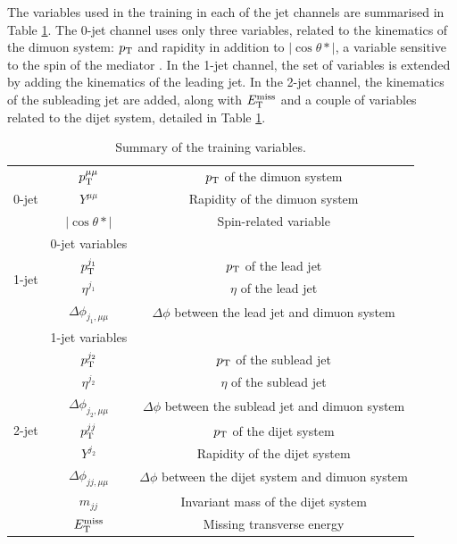 The variables used in the training in each of the jet channels are
summarised in Table \ref{tab:hmumu:variables}. The 0-jet channel uses
only three variables, related to the kinematics of the dimuon system:
$p_{\text{T}}$ and rapidity in addition to $|\cos{\theta*}|$, a variable
sensitive to the spin of the mediator \cite{PhysRevD.16.2219,
Sirunyan:2018swq}. In the 1-jet channel, the set of variables is 
extended by adding the kinematics of the leading jet. In the 2-jet
channel, the kinematics of the subleading jet are added, along with
$E_\text{T}^\text{miss}$ and a couple of variables related to the dijet system,
detailed in Table \ref{tab:hmumu:variables}.
\begin{table}[h]
\centering
\caption{Summary of the training variables.}
\label{tab:hmumu:variables}
\begin{tabular}{c c c}
\toprule
\midrule
\multirow{3}{*}{0-jet} & $p_{\text{T}}^{\mu\mu}$      & $p_{\text{T}}$ of the dimuon system \\
                       & $Y^{\mu\mu}$        & Rapidity of the dimuon system\\
                       & $|\cos{\theta*}|$   & Spin-related variable \\
\midrule
\multirow{4}{*}{1-jet} & 0-jet variables            &  \\
                       & $p_{\text{T}}^{j_1}$                & $p_{\text{T}}$ of the lead jet \\
                       & $\eta^{j_1}$               & $\eta$ of the lead jet \\
                       & $\Delta \phi_{j_1,\mu\mu}$ & $\Delta \phi$ between the lead jet and dimuon system \\
\midrule
\multirow{9}{*}{2-jet} & 1-jet variables            &  \\
                       & $p_{\text{T}}^{j_2}$                & $p_{\text{T}}$ of the sublead jet \\
                       & $\eta^{j_2}$               & $\eta$ of the sublead jet \\
                       & $\Delta \phi_{j_2,\mu\mu}$ & $\Delta \phi$ between the sublead jet and dimuon system \\
                       & $p_{\text{T}}^{jj}$                 & $p_{\text{T}}$ of the dijet system \\
                       & $Y^{j_2}$                  & Rapidity of the dijet system \\
                       & $\Delta \phi_{jj,\mu\mu}$  & $\Delta \phi$ between the dijet system and dimuon system \\
                       & $m_{jj}$                   & Invariant mass of the dijet system \\
                       & $E_\text{T}^\text{miss}$                     & Missing transverse energy \\
\midrule
\bottomrule
\end{tabular}
\end{table}

